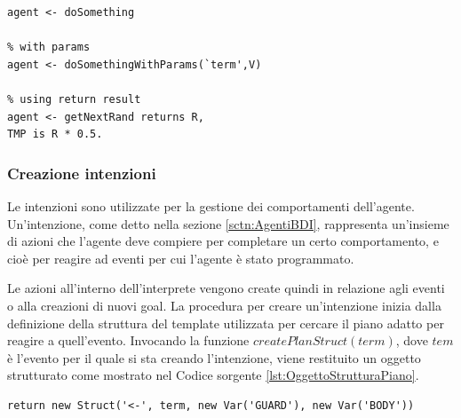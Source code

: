 \medskip
\begin{lstlisting}[firstnumber=1,label={lst:UtilizzoBindingIntuProlog},caption={Utilizzo riferimenti oggetti Java in tuProlog}]
% no params
agent <- doSomething

% with params
agent <- doSomethingWithParams(`term',V)

% using return result
agent <- getNextRand returns R,
TMP is R * 0.5.
\end{lstlisting}

\subsubsection{Creazione intenzioni}
Le intenzioni sono utilizzate per la gestione dei comportamenti dell'agente. Un'intenzione, come detto nella sezione \ref{sctn:AgentiBDI}, rappresenta un'insieme di azioni che l'agente deve compiere per completare un certo comportamento, e cioè per reagire ad eventi per cui l'agente è stato programmato.

Le azioni all'interno dell'interprete vengono create quindi in relazione agli eventi o alla creazioni di nuovi goal.
La procedura per creare un'intenzione inizia dalla definizione della struttura del template utilizzata per cercare il piano adatto per reagire a quell'evento. Invocando la funzione $createPlanStruct(term)$, dove $tem$ è l'evento per il quale si sta creando l'intenzione, viene restituito un oggetto strutturato come mostrato nel Codice sorgente \ref{lst:OggettoStrutturaPiano}.
\medskip
\begin{lstlisting}[firstnumber=1,label={lst:OggettoStrutturaPiano},caption={Oggetto che definisce la struttura del piano}]
return new Struct('<-', term, new Var('GUARD'), new Var('BODY'))
\end{lstlisting}


